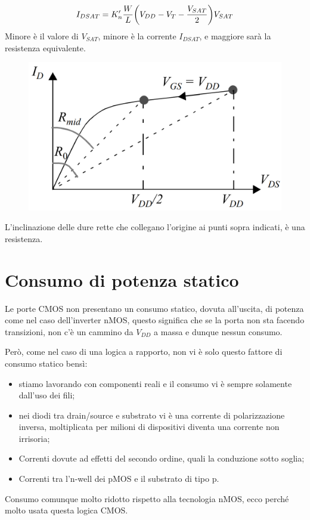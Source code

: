 \begin{equation*}
    I_{DSAT} = K_n' \frac{W}{L}\biggl(V_{DD} - V_{T} - \frac{V_{SAT}}{2}\biggl)V_{SAT}
\end{equation*}
\newpage
Minore è il valore di	$V_{SAT}$,	minore è la	corrente $I_{DSAT}$,	e	maggiore
sarà la	resistenza equivalente.


\begin{figure}[htbp]
    \centering
    \includegraphics[width=0.5\linewidth]{img/R-onne.png}    
    
\end{figure}

L'inclinazione delle dure rette che collegano l'origine ai punti sopra indicati, è una resistenza.


\section{Consumo di potenza statico}

Le	porte CMOS	non	presentano un	consumo statico, dovuta all'uscita, di	potenza come	nel caso dell'inverter nMOS, questo significa che se la porta non sta facendo transizioni, non c'è un cammino da $V_{DD}$ a massa e dunque nessun consumo.

Però, come nel caso di una logica a rapporto, non vi è solo questo fattore di consumo statico bensì:

\begin{itemize}
    \item stiamo lavorando con componenti reali e il consumo vi è sempre solamente dall'uso dei fili;
    \item nei diodi tra drain/source e substrato vi è una corrente di polarizzazione inversa, moltiplicata per milioni di dispositivi diventa una corrente non irrisoria;
    \item Correnti dovute ad	effetti del	secondo	ordine,	quali la	conduzione sotto soglia;
    \item Correnti tra l'n-well	dei pMOS e	il substrato di	tipo p.
\end{itemize}

Consumo comunque molto	ridotto rispetto alla tecnologia nMOS, ecco perché molto usata questa logica CMOS.

